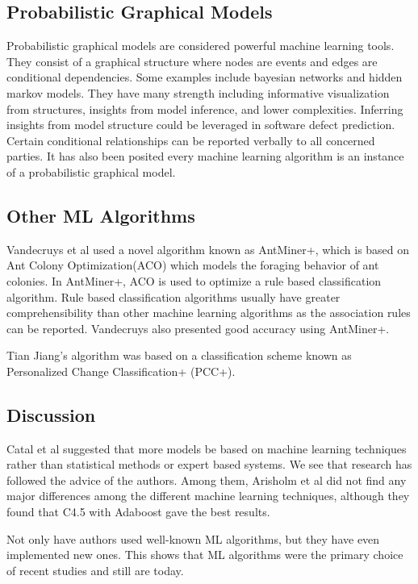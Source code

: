 \documentclass{sig-alternate-05-2015}
\begin{document}
\subsection{Probabilistic Graphical Models}
Probabilistic graphical models are considered powerful machine learning tools. They consist of a graphical structure where nodes are events and edges are conditional dependencies. Some examples include bayesian networks and hidden markov models. They have many strength including informative visualization from structures, insights from model inference, and lower complexities. Inferring insights from model structure could be leveraged in software defect prediction. Certain conditional relationships can be reported verbally to all concerned parties. It has also been posited every machine learning algorithm is an instance of a probabilistic graphical model.\cite{Bishop:2006:PRM:1162264}   

\subsection{Other ML Algorithms}
Vandecruys et al \cite{Vandecruys} used a novel algorithm known as AntMiner+, which is based on Ant Colony Optimization(ACO) which models the foraging behavior of ant colonies. In AntMiner+, ACO is used to optimize a rule based classification algorithm. Rule based classification algorithms usually have greater comprehensibility than other machine learning algorithms as the association rules can be reported. Vandecruys also presented good accuracy using AntMiner+. 

Tian Jiang's algorithm \cite{Jiang} was based on a classification scheme known as Personalized Change Classification+ (PCC+).

\subsection{Discussion}
Catal et al \cite{Catal} suggested that more models be based on machine learning techniques rather than statistical methods or expert based systems. We see that research has followed the advice of the authors. Among them, Arisholm et al \cite{Arisholm} did not find any major differences among the different machine learning techniques, although they found that C4.5 with Adaboost gave the best results. 

Not only have authors used well-known ML algorithms, but they have even implemented new ones. This shows that ML algorithms were the primary choice of recent studies and still are today.
\end{document}
